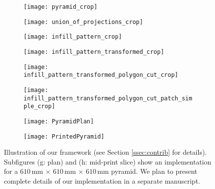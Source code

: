 \begin{figure}[htp!]
  \centering
  \begin{subfigure}[t]{1.7in}
    \texttt{[image: pyramid\_crop]}
    \caption{\small \label{pyramid}}
  \end{subfigure}
  \begin{subfigure}[t]{1.7in}
    \texttt{[image: union\_of\_projections\_crop]}
    \caption{\small \label{union_of_projections}}
  \end{subfigure}
  \begin{subfigure}[t]{1.7in}
    \texttt{[image: infill\_pattern\_crop]}
    \caption{\small \label{infill_pattern}}
  \end{subfigure}
  \begin{subfigure}[t]{1.7in}
    \texttt{[image: infill\_pattern\_transformed\_crop]}
    \caption{\small \label{infill_pattern_transformed}}
  \end{subfigure}
  \vspace*{0.05in}
  \begin{subfigure}[t]{1.7in}
    \texttt{[image: infill\_pattern\_transformed\_polygon\_cut\_crop]}
    \caption{\small \label{infill_pattern_transformed_polygon_cut}}
  \end{subfigure}
  \begin{subfigure}[t]{1.7in}
    \texttt{[image: infill\_pattern\_transformed\_polygon\_cut\_patch\_simple\_crop]}
    \caption{\small \label{infill_pattern_transformed_polygon_patch_simple}}
  \end{subfigure}
  \begin{subfigure}[t]{2.5in}
    \texttt{[image: PyramidPlan]} 
    \caption{\small \label{pyramidplan}}
  \end{subfigure}
  \begin{subfigure}[t]{2.5in}
    \texttt{[image: PrintedPyramid]}
    \caption{\small \label{printedpyramid}}
  \end{subfigure}
  \caption{ \label{infill_pattern_work_flow}
    Illustration of our framework (see Section \ref{ssec:contrib} for details).
    Subfigures (g: plan) and (h: mid-print slice) show an implementation for a  $610\,$mm $\times$ $610\,$mm $\times$ $610\,$mm pyramid.
    We plan to present complete details of our implementation in a separate manuscript.
  }
\end{figure}

